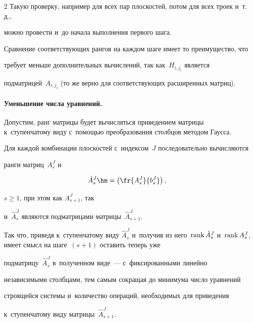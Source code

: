 \begin{multicols}{2}
Такую проверку, например для всех пар плоскостей, потом для всех троек и~т.\,д., 


можно провести и~до начала выполнения первого шага.


Сравнение соответствующих рангов на каж\-дом шаге имеет то преимущество, что 


требует меньше дополнительных вычислений, так как~$H_{i,j_i}$ является 


подматрицей~$A_{i,j_i}$ (то же верно для соответствующих расширенных матриц).








\paragraph*{Уменьшение числа уравнений.}


Допустим, ранг мат\-ри\-цы будет вычисляться приведением мат\-ри\-цы к~ступенчатому виду с~помощью преобразования столбцов методом Гаусса.


Для каждой комбинации плоскостей с~индексом~$J$ последовательно вы\-чис\-ля\-ют\-ся 


ранги матриц~$A^{J}_s$ и





\noindent


$$


\hat A^{J}_s\hm=\left(\fr{A^{J}_s}{b^{J}_s}\right),


$$





\noindent


 $s\geqslant 1$, при этом как $A^{J}_{s+1}$, так 


          и~$\hat A^{J}_s$ являются под\-мат\-ри\-ца\-ми матрицы~$\hat A^{J}_{s+1}$.


Так что, приведя к~ступенчатому виду $\hat A^{J}_s$ и~получив из него~$\rank 


\hat A^{J}_s$ и~$\rank A^{J}_s$, имеет смысл на шаге~$(s+1)$ оставить теперь уже 


под\-мат\-ри\-цу~$\hat A^{J}_s$ в~полученном виде~--- с~фиксированными линейно 


независимыми столбцами, тем самым сокращая до минимума чис\-ло уравнений 


строящейся системы и~количество операций, необходимых для приведения 


к~ступенчатому виду матрицы~$\hat A^{J}_{s+1}$.



\end{multicols}
